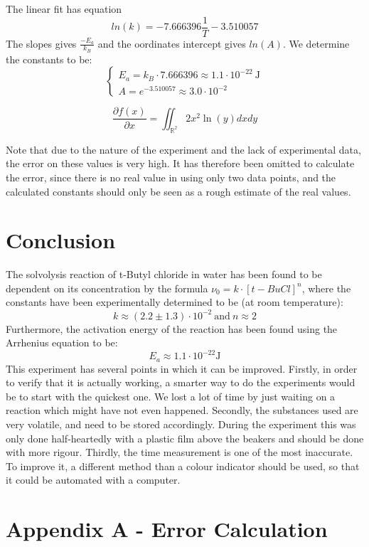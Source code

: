 \documentclass[12pt]{article}
\begin{document}
\noindent The linear fit has equation \begin{equation}
    ln(k) = -7.666396 \frac{1}{T} -3.510057
\end{equation} The slopes gives $\frac{-E_a}{k_B}$ and the oordinates intercept gives $ln(A)$. We determine the constants to be:
\[
\begin{cases}
    E_a = k_B \cdot 7.666396 \approx 1.1 \cdot 10^{-22} \ \text{J} \\
    A = e^{-3.510057} \approx 3.0 \cdot 10^{-2}
\end{cases}
\]

\begin{equation}
    \frac{\partial f(x)}{\partial x} = \iint_\mathbb{R^2} 2x^2\ln(y) dxdy
\end{equation}

\noindent Note that due to the nature of the experiment and the lack of experimental data, the error on these values is very high. It has therefore been omitted to calculate the error, since there is no real value in using only two data points, and the calculated constants should only be seen as a rough estimate of the real values.

\section{Conclusion}
The solvolysis reaction of t-Butyl chloride in water has been found to be dependent on its concentration by the formula $\nu_0 = k \cdot [t-BuCl]^n$, where the constants have been experimentally determined to be (at room temperature): \[ k \approx (2.2 \pm 1.3) \cdot 10^{-2} \ \text{and} \ n \approx 2\] Furthermore, the activation energy of the reaction has been found using the Arrhenius equation to be: \[ E_a \approx 1.1 \cdot 10^{-22} \text{J}\] This experiment has several points in which it can be improved. Firstly, in order to verify that it is actually working, a smarter way to do the experiments would be to start with the quickest one. We lost a lot of time by just waiting on a reaction which might have not even happened. Secondly, the substances used are very volatile, and need to be stored accordingly. During the experiment this was only done half-heartedly with a plastic film above the beakers and should be done with more rigour. Thirdly, the time measurement is one of the most inaccurate. To improve it, a different method than a colour indicator should be used, so that it could be automated with a computer.

\section{Appendix A - Error Calculation}
\end{document}
